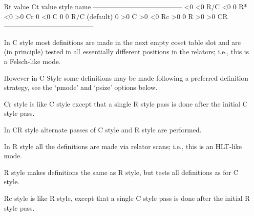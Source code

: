 \begintt
Rt value     Ct value     style name
---------------------------------------
  <0           <0         R/C
  <0            0         R*
  <0           >0         Cr
   0           <0         C
   0            0         R/C (default)
   0           >0         C
  >0           <0         Rc
  >0            0         R
  >0           >0         CR
---------------------------------------
\endtt

In C  style most definitions  are made in  the next empty  coset table
slot  and  are (in  principle)  tested  in  all essentially  different
positions in the relators; i.e., this is a Felsch-like mode.

However in C Style some  definitions may be made following a preferred
definition strategy, see the `pmode' and `psize' options below.

Cr style  is like C style  except that a  single R style pass  is done
after the initial C style pass.

In CR style alternate passes of C style and R style are performed.


In R style all the definitions  are made via relator scans; i.e., this
is an HLT-like mode.  

R\*  style  makes definitions  the  same as  R  style,  but tests  all
definitions as for C style.

Rc style is  like R style, except  that a single C style  pass is done
after the initial R style pass.

